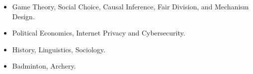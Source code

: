 \documentclass[12pt,a4paper,sans,colorlinks]{moderncv}        %
\begin{document}
\begin{itemize}

\item{Game Theory, Social Choice, Causal Inference, Fair Division, and Mechanism Design.}
\item{Political Economics, Internet Privacy and Cybersecurity.}
\item{History, Linguistics, Sociology.}
\item{Badminton, Archery.}

% 
% 
% 
% 
\end{itemize}
% 
% 
%  
% 
% 


\end{document}
